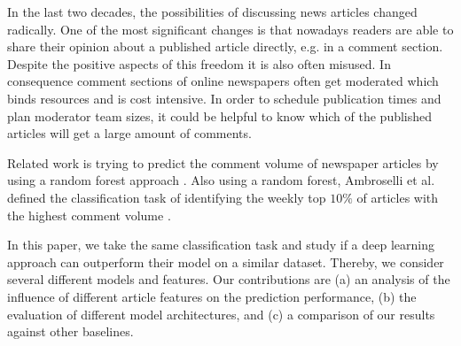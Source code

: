 In the last two decades, the possibilities of discussing news articles changed radically.
One of the most significant changes is that nowadays readers are able to share their opinion about a published article directly, e.g. in a comment section.
Despite the positive aspects of this freedom it is also often misused.
In consequence comment sections of online newspapers often get moderated which binds resources and is cost intensive.
In order to schedule publication times and plan moderator team sizes, it could be helpful to know which of the published articles will get a large amount of comments.

Related work is trying to predict the comment volume of newspaper articles by using a random forest approach \cite{tsagkias2009predicting}.
Also using a random forest, Ambroselli et al. defined the classification task of identifying the weekly top $10\%$ of articles with the highest comment volume \cite{ambroselli2018prediction}.

In this paper, we take the same classification task and study if a deep learning approach can outperform their model on a similar dataset.
Thereby, we consider several different models and features.
Our contributions are (a) an analysis of the influence of different article features on the prediction performance, (b) the evaluation of different model architectures, and (c) a comparison of our results against other baselines.
